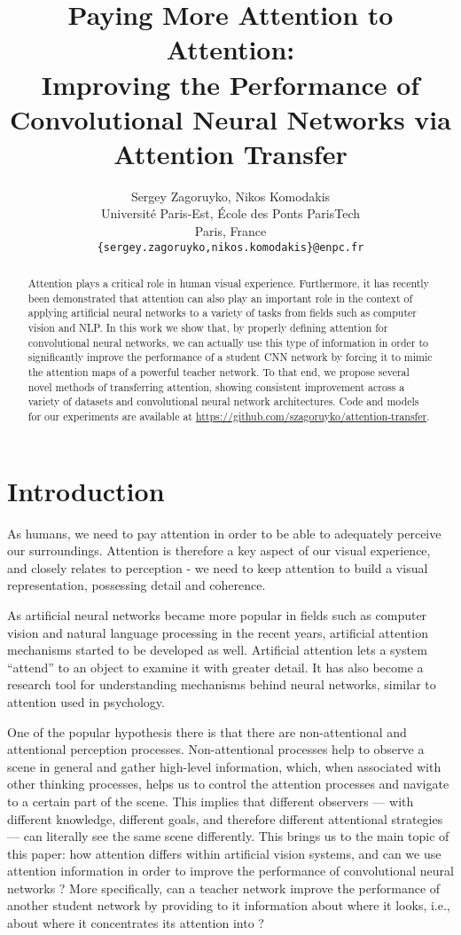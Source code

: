 \documentclass{article} \usepackage{iclr2017_conference}
\title{Paying More Attention to Attention:\\ Improving the Performance of Convolutional Neural Networks via Attention Transfer}
\author{Sergey Zagoruyko, Nikos Komodakis\\
  Universit\'e Paris-Est, \'Ecole des Ponts ParisTech\\
  Paris, France\\
  \texttt{\{sergey.zagoruyko,nikos.komodakis\}@enpc.fr}
}
\begin{document}
\maketitle


\begin{abstract}
Attention plays a critical role in human visual experience.
Furthermore, it has recently been demonstrated that attention can also play an important role in the context of applying artificial neural networks to a variety of tasks from fields such as computer vision and NLP. In this work we show that, by properly defining attention for convolutional neural networks, we can actually use this type of information in order to significantly improve the performance of a student CNN network by forcing it to mimic the attention maps of a powerful teacher network. To that end, we propose several novel methods of transferring attention, showing consistent improvement across a variety of datasets and convolutional neural network architectures. Code and models for our experiments are available at \url{https://github.com/szagoruyko/attention-transfer}.
\end{abstract}

\section{Introduction}

As humans, we need to pay attention in order to be able to adequately perceive our surroundings. Attention is therefore a key aspect of our visual experience, and closely relates to perception - we need to keep attention to build a visual representation, possessing detail and coherence.

As artificial neural networks became more popular in fields such as computer vision and natural language processing  in the recent years, artificial attention mechanisms started to be developed as well. Artificial attention lets a system ``attend'' to an object to examine it with greater detail. It has also become a research tool for understanding mechanisms behind neural networks, similar to attention used in psychology.

One of the popular hypothesis there is that there are non-attentional and attentional perception processes. Non-attentional processes help to observe a scene in general and gather high-level information, which, when associated with other thinking processes, helps us  to control the attention processes and navigate to a certain part of the scene. This implies that different observers — with different knowledge, different goals, and therefore different attentional strategies — can literally see the same scene differently. This brings us to the main topic of this paper: how attention differs within artificial vision systems, and can we use attention information in order to improve the performance of convolutional neural networks ? More specifically, can a teacher network improve the performance of another  student network by providing to  it information about where it looks, i.e., about where it concentrates its attention into ?
\end{document}
